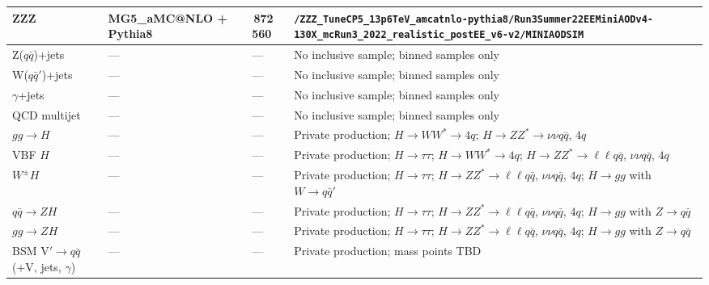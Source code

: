 \begin{landscape}
\begin{longtable}{@{}>{\raggedright\arraybackslash}p{3.2cm}>{\raggedright\arraybackslash}p{3.6cm}>{\raggedleft\arraybackslash}p{1.6cm}>{\raggedright\arraybackslash}p{13.5cm}@{}}
ZZZ & MG5\_aMC@NLO + Pythia8 & 5\,872\,560 & \nolinkurl{/ZZZ_TuneCP5_13p6TeV_amcatnlo-pythia8/Run3Summer22EEMiniAODv4-130X_mcRun3_2022_realistic_postEE_v6-v2/MINIAODSIM} \\
\midrule
Z($q\bar q$)+jets & --- & --- & No inclusive sample; binned samples only \\
W($q\bar q'$)+jets & --- & --- & No inclusive sample; binned samples only \\
$\gamma$+jets & --- & --- & No inclusive sample; binned samples only \\
QCD multijet & --- & --- & No inclusive sample; binned samples only \\
$gg\to H$ & --- & --- & Private production; $H\to WW^*\to 4q$; $H\to ZZ^*\to\nu\nu q\bar q$, $4q$ \\
VBF $H$ & --- & --- & Private production; $H\to\tau\tau$; $H\to WW^*\to 4q$; $H\to ZZ^*\to\ell\ell q\bar q$, $\nu\nu q\bar q$, $4q$ \\
$W^\pm H$ & --- & --- & Private production; $H\to\tau\tau$; $H\to ZZ^*\to\ell\ell q\bar q$, $\nu\nu q\bar q$, $4q$; $H\to gg$ with $W\to q\bar q'$ \\
$q\bar q\to ZH$ & --- & --- & Private production; $H\to\tau\tau$; $H\to ZZ^*\to\ell\ell q\bar q$, $\nu\nu q\bar q$, $4q$; $H\to gg$ with $Z\to q\bar q$ \\
$gg\to ZH$ & --- & --- & Private production; $H\to\tau\tau$; $H\to ZZ^*\to\ell\ell q\bar q$, $\nu\nu q\bar q$, $4q$; $H\to gg$ with $Z\to q\bar q$ \\
BSM V$'\to q\bar q$ (+V, jets, $\gamma$) & --- & --- & Private production; mass points TBD \\
\end{longtable}


\end{landscape}
